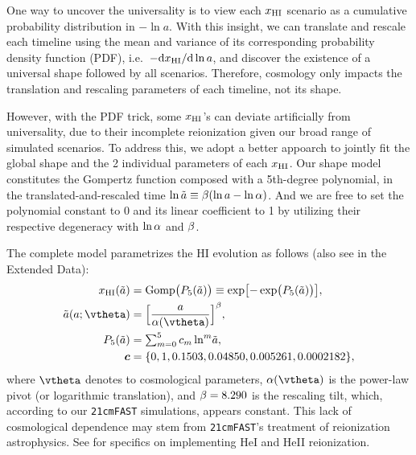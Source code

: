 One way to uncover the universality is to view each $x_{\mathrm{HI}}$ scenario as
a cumulative probability distribution in $- \ln a$.
With this insight, we can translate and rescale each timeline using the
mean and variance of its corresponding probability density function
(PDF), i.e.\ $- \mathrm{d}x_{\mathrm{HI}} / \mathrm{d}\ln a$, and discover the
existence of a universal shape followed by all scenarios.
Therefore, cosmology only impacts the translation and rescaling
parameters of each timeline, not its shape.

However, with the PDF trick, some $x_{\mathrm{HI}}$'s can deviate artificially
from universality, due to their incomplete reionization given our broad
range of simulated scenarios.
To address this, we adopt a better appoarch to jointly fit the global
shape and the 2 individual parameters of each $x_{\mathrm{HI}}$.
Our shape model constitutes the Gompertz function composed with a
5th-degree polynomial, in the translated-and-rescaled time $\ln\tilde{a}
\equiv \beta (\ln a - \ln\alpha)$.
And we are free to set the polynomial constant to 0 and its linear
coefficient to 1 by utilizing their respective degeneracy with $\ln\alpha$
and $\beta$.

The complete model parametrizes the HI evolution as follows (also see
 in the Extended Data):
%
\begin{align}
\label{eq:uni}
x_\HI(\ar) &= \Gomp\bigl( P_5(\ar) \bigr)
  \equiv \exp\bigl[ - \exp\bigl( P_5(\ar) \bigr) \bigr], \\
%
\label{eq:map}
\ar(a; \vtheta) &= \Bigl[ \frac{a}{\ap(\vtheta)} \Bigr]^\tilt ,\\
%
\label{eq:poly}
P_5(\ar) &= {\textstyle\sum}_{m=0}^5 \, c_m \ln^m\!\ar, \\
%
\nonumber
\bm{c} &= \{0, 1, 0.1503, 0.04850, 0.005261, 0.0002182\},
\end{align}
%
where $\vtheta$ denotes to  cosmological parameters, $\ap(\vtheta)$
is the power-law pivot (or logarithmic translation), and $\beta = 8.290$
is the rescaling tilt, which, according to our \texttt{21cmFAST}
simulations, appears constant.
This lack of cosmological dependence may stem from \texttt{21cmFAST}'s
treatment of reionization astrophysics.
See  for specifics on implementing HeI and HeII
reionization.

